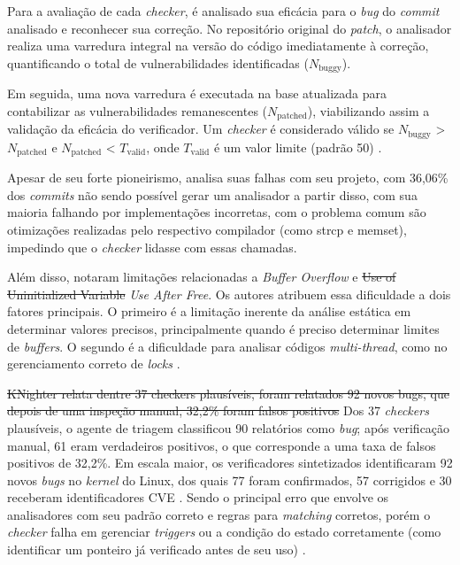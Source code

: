 \documentclass[
    12pt,                %
    openright,           %
    oneside,             %
    a4paper,             %
    english,             %
    brazil               %
]{abntex2}
\newcommand{\antigo}[1]{\sout{#1}}
\newcommand{\novo}[1]{{\color{red}#1}}
\begin{document}
Para a avaliação de cada \textit{checker}, é analisado sua eficácia para o \textit{bug} do \textit{commit} analisado e reconhecer sua correção.
No repositório original do \textit{patch}, o analisador realiza uma varredura integral na versão do código imediatamente à correção, quantificando o total de vulnerabilidades identificadas ($N_{\text{buggy}}$).
\par
Em seguida, uma nova varredura é executada na base atualizada para contabilizar as vulnerabilidades remanescentes ($N_{\text{patched}}$), viabilizando assim a validação da eficácia do verificador.
Um \textit{checker} é considerado válido se $N_{\text{buggy}}$ > $N_{\text{patched}}$ e $N_{\text{patched}}$ < $T_{\text{valid}}$, onde $T_{\text{valid}}$ é um valor limite (padrão 50) \cite{yang2025knighter}.
\par 
Apesar de seu forte pioneirismo,  analisa suas falhas com seu projeto, com 36,06\% dos \textit{commits} não sendo possível gerar um analisador a partir disso, com sua maioria falhando por implementações incorretas, com o problema comum são otimizações realizadas pelo respectivo compilador (como strcp e memset), impedindo que o \textit{checker} lidasse com essas chamadas.
\par
Além disso, notaram limitações relacionadas a \textit{Buffer Overflow} e \antigo{Use of Uninitialized Variable} \novo{\textit{Use After Free}}.
Os autores atribuem essa dificuldade a dois fatores principais.
O primeiro é a limitação inerente da análise estática em determinar valores precisos, principalmente quando é preciso determinar limites de \textit{buffers}.
O segundo é a dificuldade para analisar códigos \textit{multi-thread}, como no gerenciamento correto de \textit{locks} \cite{yang2025knighter}. 
\par 
\antigo{KNighter relata dentre 37 checkers plausíveis, foram relatados 92 novos bugs, que depois de uma inspeção manual, 32,2\% foram falsos positivos} \novo{Dos 37 \textit{checkers} plausíveis, o agente de triagem classificou 90 relatórios como \textit{bug}; após verificação manual, 61 eram verdadeiros positivos, o que corresponde a uma taxa de falsos positivos de 32,2\%. Em escala maior, os verificadores sintetizados identificaram 92 novos \textit{bugs} no \textit{kernel} do Linux, dos quais 77 foram confirmados, 57 corrigidos e 30 receberam identificadores CVE} \cite{yang2025knighter}.
Sendo o principal erro que envolve os analisadores com seu padrão correto e regras para \textit{matching} corretos, porém o \textit{checker} falha em gerenciar \textit{triggers} ou a condição do estado corretamente (como identificar um ponteiro já verificado antes de seu uso) \cite{yang2025knighter}.
\end{document}
